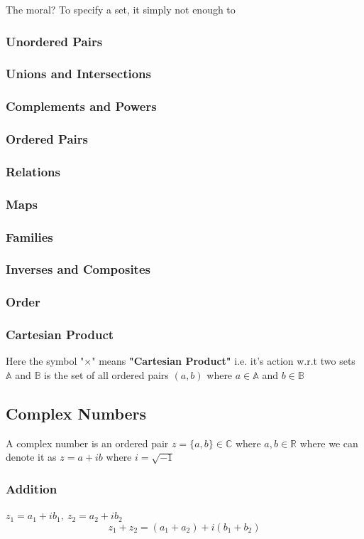 The moral? To specify a set, it simply not enough to 
\subsubsection{Unordered Pairs}
\subsubsection{Unions and Intersections}
\subsubsection{Complements and Powers}
\subsubsection{Ordered Pairs}
  \subsubsection{Relations}
\subsubsection{Maps}
\subsubsection{Families}
\subsubsection{Inverses and Composites}
\subsubsection{Order}
\subsubsection{Cartesian Product}
Here the symbol "$\times$" means \textbf{"Cartesian Product"} i.e. it's action w.r.t two sets $\mathbb{A}$ and $\mathbb{B}$ is the set of all ordered pairs $(a, b)$ where $a \in \mathbb{A}$ and $b \in \mathbb{B}$

\subsection{Complex Numbers}
\label{appendix_a}
A complex number is an ordered pair $z = \{a,b\} \in \mathbb{C}$ where $a,b \in \mathbb{R}$ where we can denote it as $z = a + ib$ where $i = \sqrt{-1}$
\subsubsection{Addition}
$z_{1} = a_{1} + ib_{1}, \ z_{2} = a_{2} + ib_{2}$
$$z_{1} + z_{2} =  (a_{1} + a_{2}) + i(b_{1} + b_{2})$$
